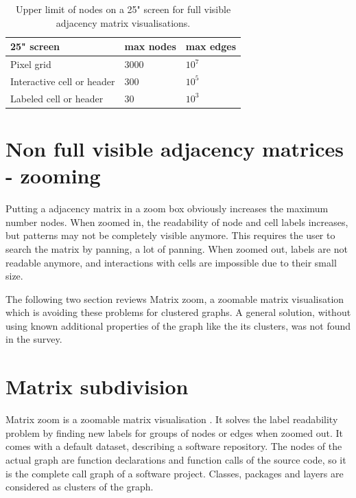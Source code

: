  
\begin{table}[]
\centering
\begin{tabular}{|l|l|l|}
\hline
25" screen                 & max nodes & max edges                \\ \hline
Pixel grid                 & 3000      & $10^7$                     \\ \hline
Interactive cell or header & 300       & $10^5$                     \\ \hline
Labeled cell or header     & 30        & $10^3$                     \\ \hline
\end{tabular}
\caption{Upper limit of nodes on a 25" screen for full visible adjacency matrix visualisations.}
\label{my-label}
\end{table}



\section{Non full visible adjacency matrices - zooming}
Putting a adjacency matrix in a zoom box obviously increases the maximum number nodes. 
When zoomed in, the readability of node and cell labels increases, but patterns may not be completely visible anymore. This requires the user to search the matrix by panning, a lot of panning. When zoomed out, labels are not readable anymore, and interactions with cells are impossible due to their small size. 

The following two section reviews Matrix zoom, a zoomable matrix visualisation which is avoiding these problems for clustered graphs. A general solution, without using known additional properties of the graph like the its clusters, was not found in the survey.

\section{Matrix subdivision}

Matrix zoom is a zoomable matrix visualisation \citep{ham-ivis-2003}. It solves the label readability problem by finding new labels for groups of nodes or edges when zoomed out. It comes with a default dataset, describing a software repository. The nodes of the actual graph are function declarations and function calls of the source code, so it is the complete call graph of a software project. Classes, packages and layers are considered as clusters of the graph. 

